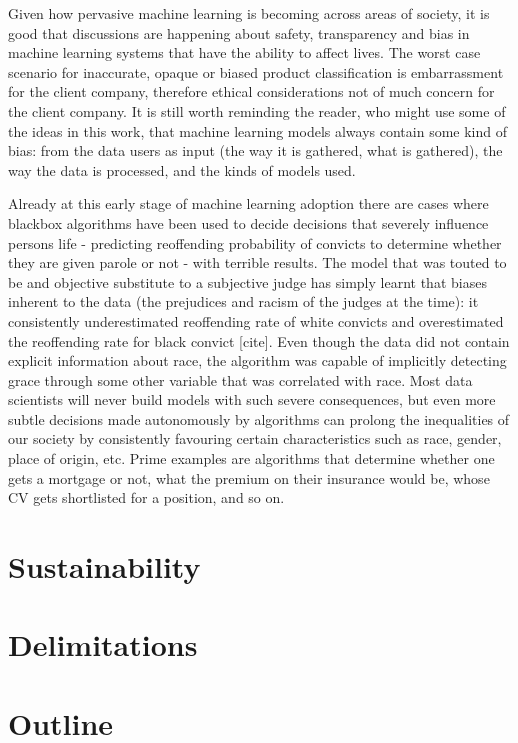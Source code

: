 Given how pervasive  machine learning is becoming across areas of society, it is good that discussions are happening about safety, transparency and bias in machine learning systems that have the ability to affect lives.
The worst case scenario for inaccurate,  opaque or biased product classification  is embarrassment for the client company,  therefore ethical considerations not of much concern for the client company.
It is still worth reminding the reader, who might use some of the ideas in this work,  that machine learning  models always contain some kind of bias:  from the data users as input (the way it is gathered, what is gathered),  the way the data is processed, and the kinds of models used.

Already at this early stage of machine learning adoption there are cases where blackbox algorithms have been used to decide decisions that severely influence persons life -  predicting reoffending probability  of convicts to determine  whether they are given parole or not - with terrible results.
The model that was touted to be and objective substitute to a subjective judge has simply learnt that biases inherent to the data (the prejudices and racism of  the judges at the time):  it consistently underestimated reoffending rate of white convicts and overestimated the reoffending rate for black convict [cite].
Even though the data did not contain explicit information about race, the algorithm  was capable of implicitly detecting grace through some other variable that was correlated with race.
Most data scientists will never build models with such severe consequences, but even more subtle decisions  made autonomously by algorithms  can prolong the  inequalities of our society by consistently favouring certain  characteristics such as race, gender, place of origin, etc.
Prime examples are algorithms that determine whether one gets a mortgage or not, what the premium on their insurance would be, whose CV gets shortlisted for a position, and so on.

\section{Sustainability}



\section{Delimitations}
\section{Outline}
